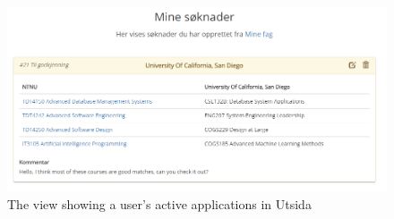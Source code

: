 \begin{figure}
    \centering
    \includegraphics[width=1\textwidth]{fig/utsida_screenshots/application_list.PNG}
    \caption{The view showing a user's active applications in Utsida}
    \label{fig:my_label}
\end{figure}
\fi